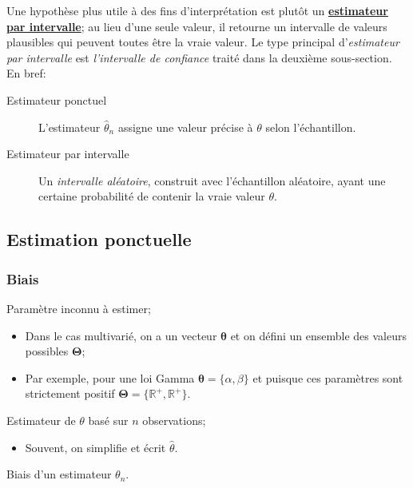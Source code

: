\documentclass[10pt, french]{article}
\begin{document}
\begin{multicols*}{2}
Une hypothèse plus utile à des fins d'interprétation est plutôt un \textbf{\hyperref[sec:int-estimation]{estimateur par intervalle}}; au lieu d'une seule valeur, il retourne un intervalle de valeurs plausibles qui peuvent toutes être la vraie valeur. 
Le type principal d'\textit{estimateur par intervalle} est \textit{l'intervalle de confiance} traité dans la deuxième sous-section.\\

En bref:
\begin{description}
	\item[Estimateur ponctuel]	L'estimateur $\hat{\theta}_{n}$ assigne une valeur précise à $\theta$ selon l'échantillon.
	\item[Estimateur par intervalle]	Un \textit{intervalle aléatoire}, construit avec l'échantillon aléatoire, ayant une certaine probabilité de contenir la vraie valeur $\theta$.
\end{description}


\subsection{Estimation ponctuelle}

\subsubsection{Biais}
\begin{distributions}[Notation]
\begin{description}[font = \normalfont]
	\item[$\theta$]	Paramètre inconnu à estimer;
		\begin{itemize}
		\item	Dans le cas multivarié, on a un vecteur $\bm{\theta}$ et on défini un ensemble des valeurs possibles $\bm{\Theta}$;
		\item	Par exemple, pour une loi Gamma $\bm{\theta}	=	\{\alpha, \beta\}$ et puisque ces paramètres sont strictement positif $\bm{\Theta}	=	\{\mathbb{R}^{+}, \mathbb{R}^{+}\}$.
		\end{itemize}
	\item[$\hat{\theta}_{n}$]	Estimateur de $\theta$ basé sur $n$ observations;
		\begin{itemize}[leftmargin = *]
		\item	Souvent, on simplifie et écrit $\hat{\theta}$.
		\end{itemize}
	\item[$\text{B}(\hat{\theta}_{n})$]	Biais d'un estimateur $\theta_{n}$.
\end{description}
\end{distributions}


\end{multicols*}
\end{document}
